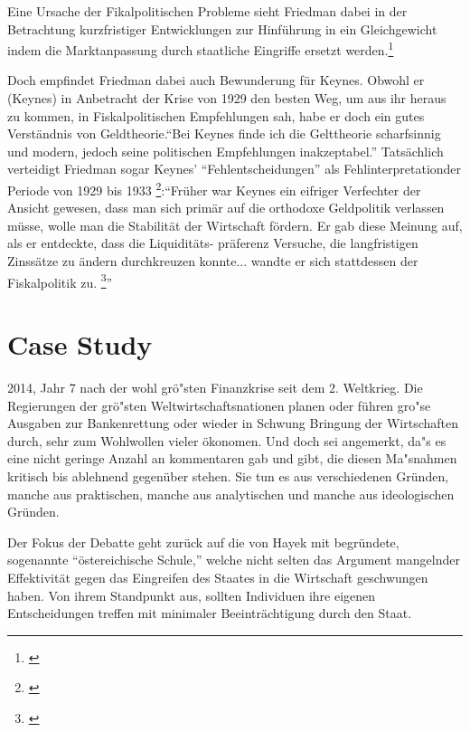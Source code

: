 \documentclass[
        onecolumn,
        a4paper,
        abstracton,
        parskip=half
        ,final
        ]{scrartcl}
\begin{document}
 Eine Ursache der Fikalpolitischen Probleme sieht Friedman dabei in der Betrachtung kurzfristiger Entwicklungen zur Hinf{\"u}hrung in ein Gleichgewicht indem die Marktanpassung durch staatliche Eingriffe ersetzt werden.\footnote[802]{\citep*[S.127]{friedman1970die}}

Doch empfindet Friedman dabei auch Bewunderung f{\"u}r Keynes. Obwohl er (Keynes) in Anbetracht der Krise von 1929 den besten Weg,
um aus ihr heraus zu kommen, in Fiskalpolitischen Empfehlungen sah, habe er doch ein gutes
Verst{\"a}ndnis von Geldtheorie."`Bei Keynes finde ich die Gelttheorie scharfsinnig und
modern, jedoch seine politischen Empfehlungen inakzeptabel."' Tats{\"a}chlich verteidigt
Friedman sogar Keynes'  "`Fehlentscheidungen"' als Fehlinterpretationder Periode von 1929
bis 1933 \footnote[803]{\citep*[S.121]{friedman1970die}}:"`Fr{\"u}her war Keynes ein eifriger Verfechter der Ansicht gewesen, dass man sich
prim{\"a}r auf die orthodoxe Geldpolitik verlassen m{\"u}sse, wolle man die Stabilit{\"a}t der
Wirtschaft f{\"o}rdern. Er gab diese Meinung auf, als er entdeckte, dass die Liquidit{\"a}ts-
pr{\"a}ferenz Versuche, die langfristigen Zinss{\"a}tze zu {\"a}ndern durchkreuzen konnte... wandte er
sich stattdessen der Fiskalpolitik zu. \footnote[804]{\citep*[S.126]{friedman1970die}}"'



\clearpage
\section{Case Study} %
\label{sec4:CaseStudy}
2014, Jahr 7 nach der wohl gr{\"o}{"s}ten Finanzkrise seit dem 2. Weltkrieg. Die Regierungen der gr{\"o}{"s}ten Weltwirtschaftsnationen planen oder f{\"u}hren gro{"s}e Ausgaben zur Bankenrettung oder wieder in Schwung Bringung der Wirtschaften durch, sehr zum Wohlwollen vieler {\"o}konomen. Und doch sei angemerkt, da{"s} es eine nicht geringe Anzahl an kommentaren gab und gibt, die diesen Ma{"s}nahmen kritisch bis ablehnend gegen{\"u}ber stehen. Sie tun es aus verschiedenen Gr{\"u}nden, manche aus praktischen, manche aus analytischen und manche aus ideologischen Gr{\"u}nden.

Der Fokus der Debatte geht zur{\"u}ck auf die von Hayek mit begr{\"u}ndete, sogenannte "`{\"o}stereichische Schule,"' welche nicht selten das Argument mangelnder Effektivit{\"a}t gegen das Eingreifen des Staates in die Wirtschaft geschwungen haben. Von ihrem Standpunkt aus, sollten Individuen ihre eigenen Entscheidungen treffen mit minimaler Beeintr{\"a}chtigung durch den Staat.
\end{document}
